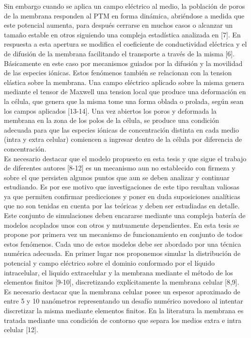 Sin embargo cuando se aplica un campo eléctrico al medio, la población de poros de la membrana responden al PTM en forma dinámica, abriéndose a medida que este potencial aumenta, para después cerrarse en muchos casos o alcanzar un tamaño estable en otros siguiendo una compleja estadística analizada en [7]. En respuesta a esta apertura se modifica el coeficiente de conductividad eléctrica y el de difusión de la membrana facilitando el transporte a través de la misma [6]. Básicamente en este caso por mecanismos guiados por la difusión y la movilidad de las especies iónicas. Estos fenómenos también se relacionan con la tension elástica sobre la membrana. Una campo eléctrico aplicado sobre la misma genera mediante el tensor de Maxwell una tension local que produce una deformación en la célula, que genera que la misma tome una forma oblada o prolada, según sean los campos aplicados [13-14]. Una vez abiertos los poros y deformada la membrana en la zona de los polos de la célula, se produce una condición adecuada para que las especies iónicas de concentración distinta en cada medio (intra y extra celular) comiencen a ingresar dentro de la célula por diferencia de concentración. \\

Es necesario destacar que el modelo propuesto en esta tesis y que sigue el trabajo de diferentes autores [8-12] es un mecanismo aun no establecido con firmeza y sobre el que persisten algunos puntos que aun se deben analizar y continuar estudiando. Es por ese motivo que investigaciones de este tipo resultan valiosas ya que permiten confirmar predicciones y poner en duda suposiciones analíticas que no son tenidas en cuenta por las teóricas y deben ser estudiadas en detalle. \\

Este conjunto de simulaciones deben encararse mediante una compleja batería de modelos acoplados unos con otros y mutuamente dependientes. En esta tesis se propone por primera vez un mecanismo de funcionamiento en conjunto de todos estos fenómenos. Cada uno de estos modelos debe ser abordado por una técnica numérica adecuada. En primer lugar nos proponemos simular la distribución de potencial y campo eléctrico sobre el dominio conformado por el líquido intracelular, el liquido extracelular y la membrana mediante el método de los elementos finitos [9-10], discretizando explícitamente la membrana celular [8,9]. Es necesario destacar que la membrana celular posee un espesor aproximado de entre 5 y 10 nanómetros representando un desafío numérico novedoso al intentar discretizar la misma mediante elementos finitos. En la literatura la membrana es tratada mediante una condición de contorno que separa los medios extra e intra celular [12]. \\

